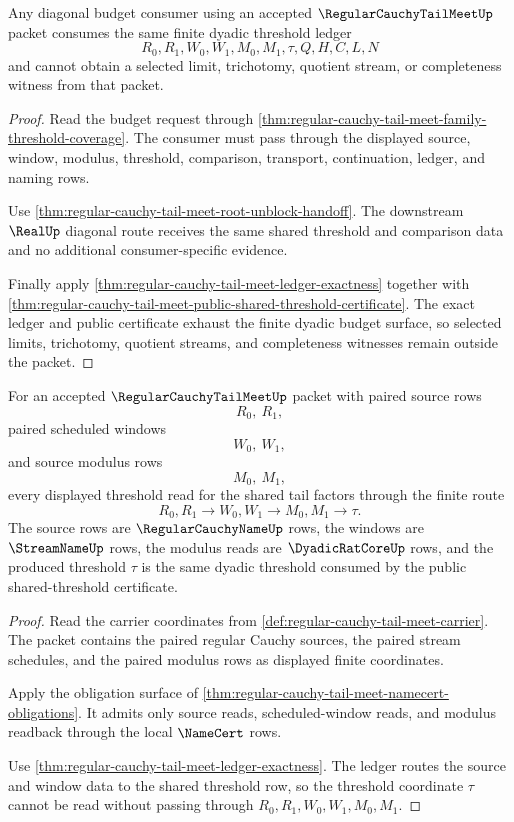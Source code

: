 \begin{theorem}
\label{thm:regular-cauchy-tail-meet-diagonal-budget-consumer}
Any diagonal budget consumer using an accepted $\RegularCauchyTailMeetUp$ packet consumes the same finite dyadic threshold ledger
$$
R_0,R_1,W_0,W_1,M_0,M_1,\tau,Q,H,C,L,N
$$
and cannot obtain a selected limit, trichotomy, quotient stream, or completeness witness from that packet.
\end{theorem}
\begin{proof}
Read the budget request through \autoref{thm:regular-cauchy-tail-meet-family-threshold-coverage}. The consumer must pass through the displayed source, window, modulus, threshold, comparison, transport, continuation, ledger, and naming rows.

Use \autoref{thm:regular-cauchy-tail-meet-root-unblock-handoff}. The downstream $\RealUp$ diagonal route receives the same shared threshold and comparison data and no additional consumer-specific evidence.

Finally apply \autoref{thm:regular-cauchy-tail-meet-ledger-exactness} together with \autoref{thm:regular-cauchy-tail-meet-public-shared-threshold-certificate}. The exact ledger and public certificate exhaust the finite dyadic budget surface, so selected limits, trichotomy, quotient streams, and completeness witnesses remain outside the packet.
\end{proof}

\begin{theorem}
\label{thm:regular-cauchy-tail-meet-window-source-coverage}
For an accepted $\RegularCauchyTailMeetUp$ packet with paired source rows
$$
R_0,\ R_1,
$$
paired scheduled windows
$$
W_0,\ W_1,
$$
and source modulus rows
$$
M_0,\ M_1,
$$
every displayed threshold read for the shared tail factors through the finite route
$$
R_0,R_1 \longrightarrow W_0,W_1 \longrightarrow M_0,M_1 \longrightarrow \tau.
$$
The source rows are $\RegularCauchyNameUp$ rows, the windows are $\StreamNameUp$ rows, the modulus reads are $\DyadicRatCoreUp$ rows, and the produced threshold $\tau$ is the same dyadic threshold consumed by the public shared-threshold certificate.
\end{theorem}
\begin{proof}
Read the carrier coordinates from \autoref{def:regular-cauchy-tail-meet-carrier}. The packet contains the paired regular Cauchy sources, the paired stream schedules, and the paired modulus rows as displayed finite coordinates.

Apply the obligation surface of \autoref{thm:regular-cauchy-tail-meet-namecert-obligations}. It admits only source reads, scheduled-window reads, and modulus readback through the local $\NameCert$ rows.

Use \autoref{thm:regular-cauchy-tail-meet-ledger-exactness}. The ledger routes the source and window data to the shared threshold row, so the threshold coordinate $\tau$ cannot be read without passing through $R_0,R_1,W_0,W_1,M_0,M_1$.
\end{proof}

